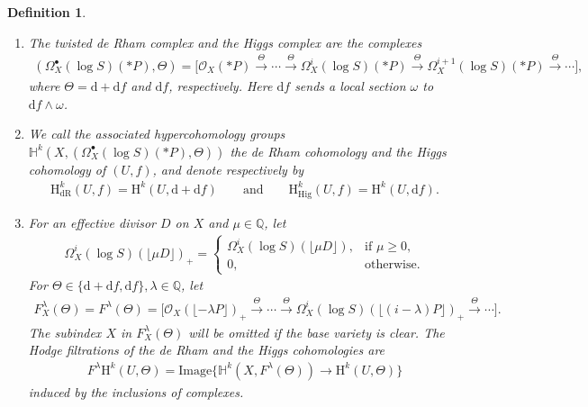 \documentclass[11pt]{article}
\newcommand{\HH}{\mathbb{H}}
\newcommand{\QQ}{\mathbb{Q}}
\newcommand{\sO}{\mathscr{O}}
\newcommand{\de}{\mathrm{d}}
\newcommand{\dR}{\mathrm{dR}}
\newcommand{\Hig}{\mathrm{Hig}}
\newcommand{\coH}{\mathrm{H}}
\newcommand{\ddRH}{\Theta}
\newcommand{\flr}[1]{\lfloor #1 \rfloor}
\newtheorem*{definition*}{Definition}
\begin{document}
\begin{definition*}\quad\begin{enumerate}\itemsep=0pt
\item[(i)] The \textit{twisted de Rham complex} and the \textit{Higgs complex} are the complexes
\begin{gather*}
(\Omega_X^\bullet(\log S)(*P), \ddRH) = \big[ \sO_X(*P) \!\xrightarrow{\ddRH} \!\cdots\! \xrightarrow{\ddRH} \! \Omega_X^i(\log S)(*P) \!\xrightarrow{\ddRH}\! \Omega_X^{i+1}(\log S)(*P)\xrightarrow{\ddRH}\!\cdots \big],
\end{gather*}
where $\ddRH = \de + \de f$ and $\de f$, respectively. Here $\de f$ sends a local section $\omega$ to $\de f\wedge \omega$.

\item[(ii)] We call the associated hypercohomology groups $\HH^k(X,(\Omega_X^\bullet(\log S)(*P), \ddRH))$ the \textit{de Rham cohomology} and the \textit{Higgs cohomology of $(U,f)$}, and denote respectively by
\begin{gather*} \coH_\dR^k(U,f) = \coH^k(U,\de +\de f) \qquad\text{and}\qquad \coH_\Hig^k(U,f) = \coH^k(U,\de f). \end{gather*}

\item[(iii)] For an effective divisor $D$ on $X$ and $\mu\in\QQ$, let
\begin{gather*} \Omega_X^i(\log S)(\flr{\mu D})_+ = \begin{cases}
\Omega_X^i(\log S)(\flr{\mu D}), & \text{if $\mu\geq 0$}, \\
0, & \text{otherwise}.
\end{cases} \end{gather*}
For $\ddRH \in \{\de +\de f, \de f\}, \lambda \in \QQ$, let
\begin{gather*} F_X^\lambda(\ddRH) = F^\lambda(\ddRH) =
\big[ \sO_X(\flr{-\lambda P})_+ \xrightarrow{\ddRH} \cdots \xrightarrow{\ddRH} \Omega_X^i(\log S)(\flr{(i-\lambda)P})_+ \xrightarrow{\ddRH} \cdots \big]. \end{gather*}
The subindex $X$ in $F_X^\lambda(\ddRH)$ will be omitted if the base variety is clear. The \textit{Hodge filtrations} of the de Rham and the Higgs cohomologies are \begin{gather}\label{eq:H-fil}
F^\lambda\coH^k(U,\ddRH) = \mathrm{Image}\big\{ \HH^k(X,F^\lambda(\ddRH)) \to \coH^k(U,\ddRH) \big\}
\end{gather}
induced by the inclusions of complexes.


\end{enumerate}
\end{definition*}
\end{document}
